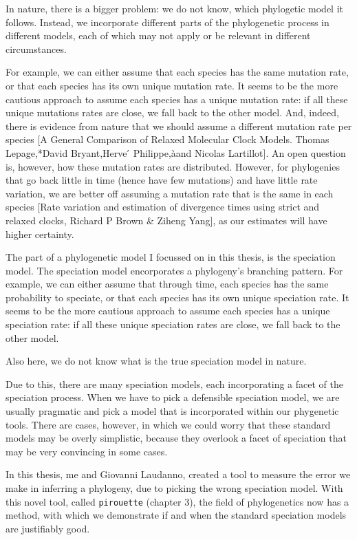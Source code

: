 In nature, there is a bigger problem: 
we do not know, which phylogetic model it follows.
Instead, we incorporate different parts
of the phylogenetic process in different models, 
each of which may not apply or be relevant in different circumstances.

For example, we can either assume that each species has the same
mutation rate, or that each species has
its own unique mutation rate.
It seems to be the more cautious approach to
assume each species has a unique mutation rate: 
if all these unique mutations rates are close, we fall back
to the other model.
And, indeed, there is evidence from nature that we should 
assume a different mutation rate per species [A General Comparison of Relaxed Molecular Clock Models. Thomas Lepage,*David Bryant,Herve ́ Philippe,àand Nicolas Lartillot].
An open question is, however, how these mutation rates are distributed.
However, for phylogenies that go back little in time (hence
have few mutations) and have little rate variation,
we are better off assuming a mutation rate that is the same in each
species [Rate variation and estimation of divergence times using strict and relaxed clocks, Richard P Brown & Ziheng Yang],
as our estimates will have higher certainty.

The part of a phylogenetic model I focussed on in this thesis,
is the speciation model. The speciation model encorporates
a phylogeny's branching pattern. 
For example, we can either assume that through time,
each species has the same probability to speciate, 
or that each species has
its own unique speciation rate.
It seems to be the more cautious approach to
assume each species has a unique speciation rate: 
if all these unique speciation rates are close, we fall back
to the other model.


Also here, we do not know what is the
true speciation model in nature.

Due to this, there are many speciation models, each
incorporating a facet of the speciation process. When we have to
pick a defensible speciation model, we are usually pragmatic and
pick a model that is incorporated within our phygenetic
tools. There are cases, however, in which we could worry that these
standard models may be overly simplistic, because they overlook a 
facet of speciation that may be very convincing in some cases.

In this thesis, me and Giovanni Laudanno, created a tool to
measure the error we make in inferring a phylogeny, due to
picking the wrong speciation model. 
With this novel tool, called \verb;pirouette; (chapter 3),
the field of phylogenetics now has a method, 
with which we demonstrate if and when the standard speciation models
are justifiably good.


